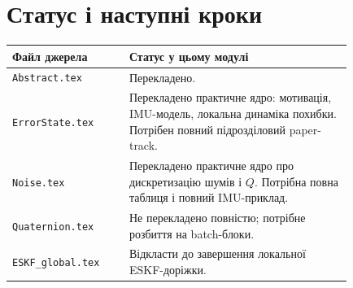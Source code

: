 \section{Статус і наступні кроки}

\begin{center}
\begin{tabular}{p{0.28\linewidth}p{0.55\linewidth}}
\toprule
Файл джерела & Статус у цьому модулі\\
\midrule
\texttt{Abstract.tex} & Перекладено.\\
\texttt{ErrorState.tex} & Перекладено практичне ядро: мотивація, IMU-модель, локальна динаміка похибки. Потрібен повний підрозділовий paper-track.\\
\texttt{Noise.tex} & Перекладено практичне ядро про дискретизацію шумів і $Q$. Потрібна повна таблиця і повний IMU-приклад.\\
\texttt{Quaternion.tex} & Не перекладено повністю; потрібне розбиття на batch-блоки.\\
\texttt{ESKF\_global.tex} & Відкласти до завершення локальної ESKF-доріжки.\\
\bottomrule
\end{tabular}
\end{center}
